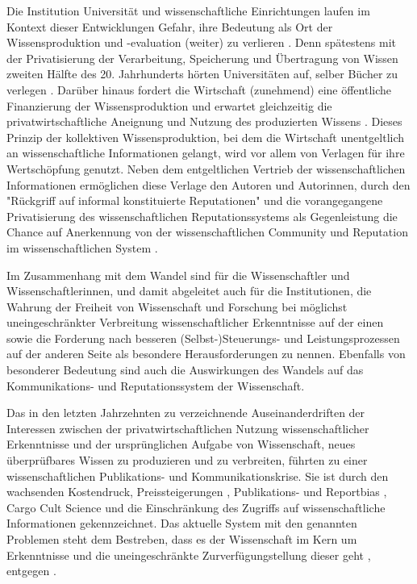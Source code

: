 Die Institution Universität und wissenschaftliche Einrichtungen laufen im Kontext dieser Entwicklungen Gefahr, ihre Bedeutung als Ort der Wissensproduktion und -evaluation (weiter) zu verlieren \cite[:343]{Kruecken_2001}. Denn spätestens mit der Privatisierung der Verarbeitung, Speicherung und Übertragung von Wissen zweiten Hälfte des 20. Jahrhunderts hörten Universitäten auf, selber Bücher zu verlegen \cite{Jospeph_2006}. Darüber hinaus fordert die Wirtschaft (zunehmend) eine öffentliche Finanzierung der Wissensproduktion und erwartet gleichzeitig die privatwirtschaftliche Aneignung und Nutzung des produzierten Wissens \cite{Weingart_2001}. Dieses Prinzip der kollektiven Wissensproduktion, bei dem die Wirtschaft unentgeltlich an wissenschaftliche Informationen gelangt, wird vor allem von Verlagen für ihre Wertschöpfung genutzt. Neben dem entgeltlichen Vertrieb der wissenschaftlichen Informationen ermöglichen diese Verlage den Autoren und Autorinnen, durch den "Rückgriff auf informal konstituierte Reputationen" \cite[:237]{Luhmann_1970} und die vorangegangene Privatisierung des wissenschaftlichen Reputationssystems als Gegenleistung die Chance auf Anerkennung von der wissenschaftlichen Community und Reputation im wissenschaftlichen System \cite{Bernius_2009}.

Im Zusammenhang mit dem Wandel sind für die Wissenschaftler und Wissenschaftlerinnen, und damit abgeleitet auch für die Institutionen, die Wahrung der Freiheit von Wissenschaft und Forschung bei möglichst uneingeschränkter Verbreitung wissenschaftlicher Erkenntnisse \cite{Hagner_2015} \cite{BBAW_2015} \cite{Buss_2001} auf der einen sowie die Forderung nach besseren (Selbst-)Steuerungs- und Leistungsprozessen \cite{Adler_2009} \cite{Gibbons_1994} auf der anderen Seite als besondere Herausforderungen zu nennen. Ebenfalls von besonderer Bedeutung sind auch die Auswirkungen des Wandels auf das Kommunikations- und Reputationssystem der Wissenschaft.

Das in den letzten Jahrzehnten zu verzeichnende Auseinanderdriften der Interessen zwischen der privatwirtschaftlichen Nutzung wissenschaftlicher Erkenntnisse und der ursprünglichen Aufgabe von Wissenschaft, neues überprüfbares Wissen zu produzieren und zu verbreiten, führten zu einer wissenschaftlichen Publikations- und Kommunikationskrise. Sie ist durch den wachsenden Kostendruck, Preissteigerungen \cite{Lewis_2015}, Publikations- \cite{Egger_1997} \cite{Fanelli_2012} \cite{Beverungen_2012} \cite{Brembs_20013} und Reportbias \cite{Chan_2008} \cite{Dickersin_2011}, Cargo Cult Science \cite{Feynman_1974} und die Einschränkung des Zugriffs auf wissenschaftliche Informationen \cite{Hess_2006} gekennzeichnet. Das aktuelle System mit den genannten Problemen steht dem Bestreben, dass es der Wissenschaft im Kern um Erkenntnisse und die uneingeschränkte Zurverfügungstellung dieser geht \cite{Hanekop_2006}, entgegen \cite{Offhaus_2012}.


